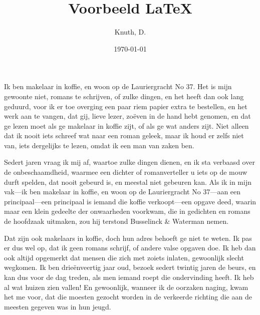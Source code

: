 \documentclass[a4paper,12pt]{article}
\title{Voorbeeld {\LaTeX}}
\author{Knuth, D.}
\date{\today}
\begin{document}
\maketitle

Ik ben makelaar in koffie, en woon op de Lauriergracht No 37. Het is mijn gewoonte niet, romans te schrijven, of zulke dingen, en het heeft dan ook lang geduurd, voor ik er toe overging een paar riem papier extra te bestellen, en het werk aan te vangen, dat gij, lieve lezer, zoëven in de hand hebt genomen, en dat ge lezen moet als ge makelaar in koffie zijt, of als ge wat anders zijt. Niet alleen dat ik nooit iets schreef wat naar een roman geleek, maar ik houd er zelfs niet van, iets dergelijks te lezen, omdat ik een man van zaken ben.

Sedert jaren vraag ik mij af, waartoe zulke dingen dienen, en ik sta verbaasd over de onbeschaamdheid, waarmee een dichter of romanverteller u iets op de mouw durft spelden, dat nooit gebeurd is, en meestal niet gebeuren kan. Als ik in mijn vak---ik ben makelaar in koffie, en woon op de Lauriergracht No 37---aan een principaal---een principaal is iemand die koffie verkoopt---een opgave deed, waarin maar een klein gedeelte der onwaarheden voorkwam, die in gedichten en romans de hoofdzaak uitmaken, zou hij terstond Busselinck \& Waterman nemen.

Dat zijn ook makelaars in koffie, doch hun adres behoeft ge niet te weten. Ik pas er dus wel op, dat ik geen romans schrijf, of andere valse opgaven doe. Ik heb dan ook altijd opgemerkt dat mensen die zich met zoiets inlaten, gewoonlijk slecht wegkomen. Ik ben drieënveertig jaar oud, bezoek sedert twintig jaren de beurs, en kan dus voor de dag treden, als men iemand roept die ondervinding heeft. Ik heb al wat huizen zien vallen! En gewoonlijk, wanneer ik de oorzaken naging, kwam het me voor, dat die moesten gezocht worden in de verkeerde richting die aan de meesten gegeven was in hun jeugd.
\end{document}
